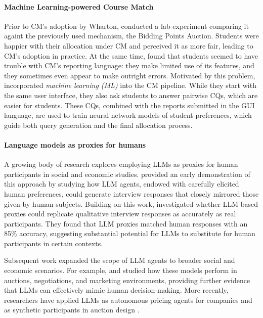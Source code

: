 \paragraph{Machine Learning-powered Course Match}
Prior to CM's adoption by Wharton, \citet{budish2021can} conducted a lab experiment comparing it againt the previously used mechanism, the Bidding Points Auction. Students were happier with their allocation under CM and perceived it as more fair, leading to CM's adoption in practice.
At the same time, \citet{budish2021can} found that students seemed to have trouble with CM's reporting language: 
they make limited use of its features, 
and they sometimes even appear to make outright errors.
Motivated by this problem, \citet{soumalias2024machine} incorporated \textit{machine learning (ML)} into the CM pipeline.
While they start with the same user interface, they also ask students to answer pairwise CQs, which are easier for students. 
These CQs, combined with the reports submitted in the GUI language, are used to train neural network models of student preferences, which guide both query generation and the final allocation process.

\paragraph{Language models as proxies for humans}
A growing body of research explores employing LLMs as proxies for human participants in social and economic studies. 
\citet{horton2023large} provided an early demonstration of this approach by studying how LLM agents, endowed with carefully elicited human preferences, could generate interview responses that closely mirrored those given by human subjects. Building on this work, \citet{park2024generative} investigated whether LLM-based proxies could replicate qualitative interview responses as accurately as real participants. They found that LLM proxies matched human responses with an 85\% accuracy, suggesting substantial potential for LLMs to substitute for
human participants in certain contexts.

Subsequent work expanded the scope of LLM agents to broader social and economic scenarios. For example, \citet{brand2023using} and \citet{manning2024automated} studied how these models perform in auctions, negotiations, and marketing environments, providing further evidence that LLMs can effectively mimic human decision-making. More recently, researchers have applied LLMs as autonomous pricing agents for companies \cite{fish2024algorithmic} and as synthetic participants in auction design \cite{zhuevidence}.



